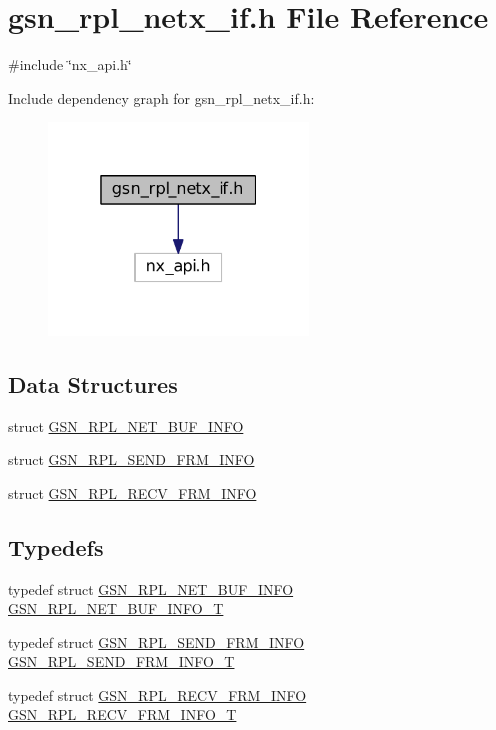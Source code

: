 \hypertarget{a00580}{
\section{gsn\_\-rpl\_\-netx\_\-if.h File Reference}
\label{a00580}
}
{\ttfamily \#include \char`\"{}nx\_\-api.h\char`\"{}}\par
Include dependency graph for gsn\_\-rpl\_\-netx\_\-if.h:
\nopagebreak
\begin{figure}[H]
\begin{center}
\leavevmode
\includegraphics[width=196pt]{a00816}
\end{center}
\end{figure}
\subsection*{Data Structures}
\begin{DoxyCompactItemize}
\item 
struct \hyperlink{a00207}{GSN\_\-RPL\_\-NET\_\-BUF\_\-INFO}
\item 
struct \hyperlink{a00211}{GSN\_\-RPL\_\-SEND\_\-FRM\_\-INFO}
\item 
struct \hyperlink{a00208}{GSN\_\-RPL\_\-RECV\_\-FRM\_\-INFO}
\end{DoxyCompactItemize}
\subsection*{Typedefs}
\begin{DoxyCompactItemize}
\item 
typedef struct \hyperlink{a00207}{GSN\_\-RPL\_\-NET\_\-BUF\_\-INFO} \hyperlink{a00580_a489578eb1ef10ebcd7f4353f4d1af7b1}{GSN\_\-RPL\_\-NET\_\-BUF\_\-INFO\_\-T}
\item 
typedef struct \hyperlink{a00211}{GSN\_\-RPL\_\-SEND\_\-FRM\_\-INFO} \hyperlink{a00580_ae5a3a277cf1fd6ef3ce9dbf918e7c2d8}{GSN\_\-RPL\_\-SEND\_\-FRM\_\-INFO\_\-T}
\item 
typedef struct \hyperlink{a00208}{GSN\_\-RPL\_\-RECV\_\-FRM\_\-INFO} \hyperlink{a00580_a61f57186267c3617b1816c75d639b467}{GSN\_\-RPL\_\-RECV\_\-FRM\_\-INFO\_\-T}
\end{DoxyCompactItemize}
